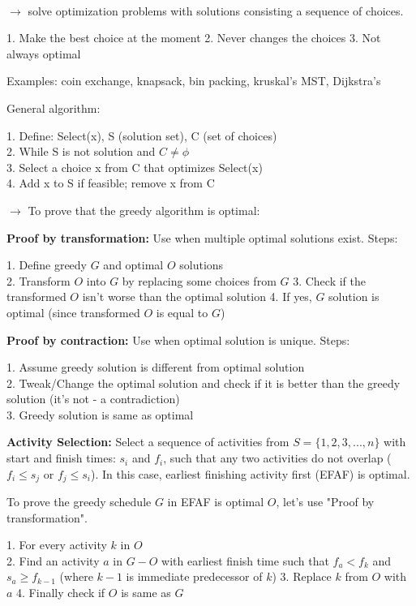 \\
$\rightarrow$ solve optimization problems with solutions consisting a sequence of choices. 

1. Make the best choice at the moment
2. Never changes the choices
3. Not always optimal

Examples: coin exchange, knapsack, bin packing, kruskal's MST, Dijkstra's 

General algorithm:

1. Define: Select(x), S (solution set), C (set of choices) \\
2. While S is not solution and $C \neq \phi$ \\
3. Select a choice x from C that optimizes Select(x) \\
4. Add x to S if feasible; remove x from C

$\rightarrow$ To prove that the greedy algorithm is optimal:

\textbf{Proof by transformation:} Use when multiple optimal solutions exist. Steps:

1. Define greedy $G$ and optimal $O$ solutions\\
2. Transform $O$ into $G$ by replacing some choices from $G$
3. Check if the transformed $O$ isn't worse than the optimal solution
4. If yes, $G$ solution is optimal (since transformed $O$ is equal to $G$)

\textbf{Proof by contraction:} Use when optimal solution is unique. Steps:

1. Assume greedy solution is different from optimal solution\\
2. Tweak/Change the optimal solution and check if it is better than the greedy solution (it's not - a contradiction)\\
3. Greedy solution is same as optimal

\textbf{Activity Selection:} Select a sequence of activities from $S = \{1,2,3,...,n\}$ with start and finish times: $s_i$ and $f_i$, such that any two activities do not overlap ($f_i \le s_j$ or $f_j \le s_i$). In this case, earliest finishing activity first (EFAF) is optimal.

To prove the greedy schedule $G$ in EFAF is optimal $O$, let's use "Proof by transformation". 

1. For every activity $k$ in $O$\\
2. Find an activity $a$ in $G-O$ with earliest finish time such that $f_a < f_k$ and $s_a \ge f_{k-1}$ (where $k-1$ is immediate predecessor of $k$)
3. Replace $k$ from $O$ with $a$
4. Finally check if $O$ is same as $G$

